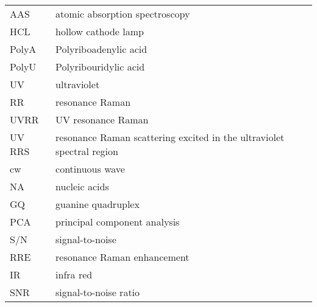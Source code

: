 

\noindent
\begin{tabularx}{\textwidth}{@{}l@{\,\dotfill\dots\,}X@{}}
AAS
	& atomic absorption spectroscopy\\
HCL
	& hollow cathode lamp\\
PolyA
	& Polyriboadenylic acid\\
PolyU
	& Polyribouridylic acid\\
UV
	& ultraviolet\\
RR
	& resonance Raman\\
UVRR
	& UV resonance Raman\\
UV RRS
	& resonance Raman scattering excited in the ultraviolet spectral region\\
cw
	& continuous wave\\
NA
	& nucleic acids\\
GQ
	& guanine quadruplex\\
PCA
	& principal component analysis\\
S/N
	& signal-to-noise\\
RRE
	& resonance Raman enhancement\\
IR
	& infra red\\
SNR
	& signal-to-noise ratio
\end{tabularx}
